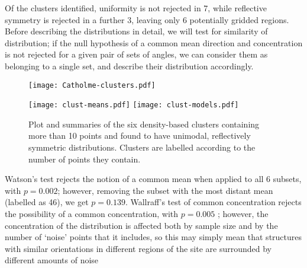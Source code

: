 \documentclass[../../ArchStats.tex]{subfiles}
\begin{document}
Of the clusters identified, uniformity is not rejected in 7, while reflective symmetry is rejected in a further 3, leaving only 6 potentially gridded regions. Before describing the distributions in detail, we will test for similarity of distribution; if the null hypothesis of a common mean direction and concentration is not rejected for a given pair of sets of angles, we can consider them as belonging to a single set, and describe their distribution accordingly.


\begin{figure}[!ht]
\caption{Plot and summaries of the six density-based clusters containing more than 10 points and found to have unimodal, reflectively symmetric distributions. Clusters are labelled according to the number of points they contain.} 
\begin{minipage}[t]{0.47\textwidth}
\centering
{}
\label{}
 \texttt{[image: Catholme-clusters.pdf]}
 \end{minipage}
 \hfill
	\begin{minipage}[t]{0.47\textwidth}
  \centering
	\label{}
	\texttt{[image: clust-means.pdf]}
	  \vspace{20pt}
	\centering
		\texttt{[image: clust-models.pdf]}
    \end{minipage}
 \end{figure}



Watson's test rejects the notion of a common mean when applied to all 6 subsets, with $p = 0.002$; however, removing the subset with the most distant mean (labelled as 46), we get $p = 0.139$. Wallraff's test of common concentration rejects the possibility of a common concentration, with $p = 0.005$ ; however, the concentration of the distribution is affected both by sample size and by the number of `noise' points that it includes, so this may simply mean that structures with similar orientations in different regions of the site are surrounded by different amounts of noise






\end{document}
